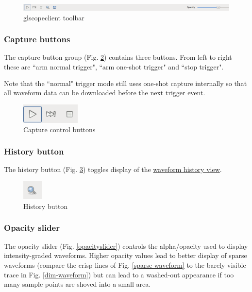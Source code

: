 \begin{figure}[h]
\centering
\includegraphics[width=16cm]{images/toolbar.png}
\caption{glscopeclient toolbar}
\label{toolbar}
\end{figure}

\subsubsection{Capture buttons}

The capture button group (Fig. \ref{capturebuttons}) contains three buttons. From left to right these are ``arm
normal trigger", ``arm one-shot trigger" and ``stop trigger".

Note that the ``normal" trigger mode still uses one-shot capture internally so that all waveform data can be downloaded
before the next trigger event.

\begin{figure}[h]
\centering
\includegraphics[height=1cm]{images/capture-icons.png}
\caption{Capture control buttons}
\label{capturebuttons}
\end{figure}

\subsubsection{History button}

The history button (Fig. \ref{historybutton}) toggles display of the \hyperref[sec:history]{waveform history view}.

\begin{figure}[h]
\centering
\includegraphics[height=1cm]{images/history-button.png}
\caption{History button}
\label{historybutton}
\end{figure}

\subsubsection{Opacity slider}

The opacity slider (Fig. \ref{opacityslider}) controls the alpha/opacity used to display intensity-graded waveforms.
Higher opacity values lead to better display of sparse waveforms (compare the crisp lines of Fig. \ref{sparse-waveform}
to the barely visible trace in Fig. \ref{dim-waveform}) but can lead to a washed-out appearance if too many sample
points are shoved into a small area.

